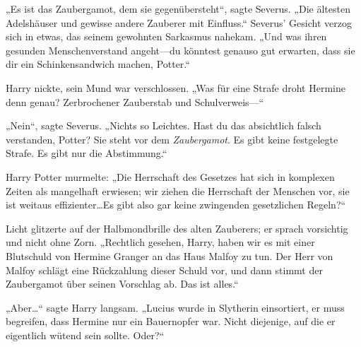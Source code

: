 „Es ist das Zaubergamot, dem sie gegenübersteht“, sagte Severus.
„Die ältesten Adelshäuser und gewisse andere Zauberer mit Einfluss.“ Severus’ Gesicht verzog sich in etwas, das seinem gewohnten Sarkasmus nahekam.
„Und was ihren gesunden Menschenverstand angeht—du könntest genauso gut erwarten, dass sie dir ein Schinkensandwich machen, Potter.“

Harry nickte, sein Mund war verschlossen.
„Was für eine Strafe droht Hermine denn genau? Zerbrochener Zauberstab und Schulverweis—“

„Nein“, sagte Severus.
„Nichts so Leichtes. Hast du das absichtlich falsch verstanden, Potter? Sie steht vor dem \emph{Zaubergamot}. Es gibt keine festgelegte Strafe. Es gibt nur die Abstimmung.“

Harry Potter murmelte:
„Die Herrschaft des Gesetzes hat sich in komplexen Zeiten als mangelhaft erwiesen; wir ziehen die Herrschaft der Menschen vor, sie ist weitaus effizienter…Es gibt also gar keine zwingenden gesetzlichen Regeln?“

Licht glitzerte auf der Halbmondbrille des alten Zauberers; er sprach vorsichtig und nicht ohne Zorn.
„Rechtlich gesehen, Harry, haben wir es mit einer Blutschuld von Hermine Granger an das Haus Malfoy zu tun. Der Herr von Malfoy schlägt eine Rückzahlung dieser Schuld vor, und dann stimmt der Zaubergamot über seinen Vorschlag ab. Das ist alles.“

„Aber…“ sagte Harry langsam.
„Lucius wurde in Slytherin einsortiert, er muss begreifen, dass Hermine nur ein Bauernopfer war. Nicht diejenige, auf die er eigentlich wütend sein sollte. Oder?“

